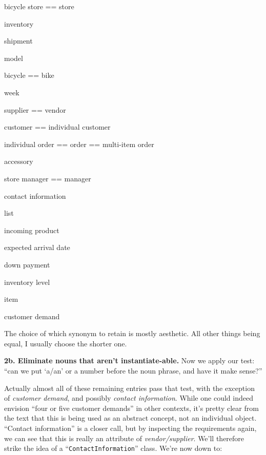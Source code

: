 \begin{samepage}
\begin{multicols}{2}
\small
\begin{compactitem}
\renewcommand\labelitemi{\raisebox{0.25ex}{\small$\bullet$}}
\item \textsf{bicycle store == store}
\item \textsf{inventory}
\item \textsf{shipment}
\item \textsf{model}
\item \textsf{bicycle == bike}
\item \textsf{week}
\item \textsf{supplier == vendor}
\item \textsf{customer == individual customer}
\item \textsf{individual order == order == multi-item order}
\columnbreak
\item \textsf{accessory}
\item \textsf{store manager == manager}
\item \textsf{contact information}
\item \textsf{list}
\item \textsf{incoming product}
\item \textsf{expected arrival date}
\item \textsf{down payment}
\item \textsf{inventory level}
\item \textsf{item}
\item \textsf{customer demand}
\end{compactitem}
\end{multicols}
\end{samepage}

The choice of which synonym to retain is mostly aesthetic. All other things
being equal, I usually choose the shorter one.

\vspace{.3in}
\textbf{2b. Eliminate nouns that aren't instantiate-able.} Now we apply our
test: ``can we put `a/an' or a number before the noun phrase, and have it make
sense?''

Actually almost all of these remaining entries pass that test, with the
exception of \textit{customer demand}, and possibly \textit{contact
information}. While one could indeed envision ``four or five customer demands''
in other contexts, it's pretty clear from the text that this is being used as
an abstract concept, not an individual object. ``Contact information'' is a
closer call, but by inspecting the requirements again, we can see that this is
really an attribute of \textit{vendor/supplier}. We'll therefore strike the
idea of a ``\texttt{ContactInformation}'' class. We're now down to:

